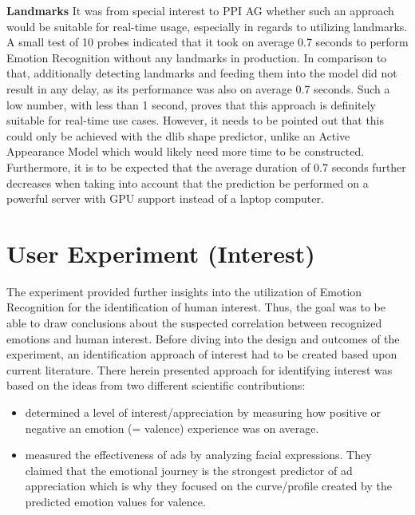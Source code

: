 \textbf{Landmarks}\newline
It was from special interest to PPI AG whether such an approach would be suitable for real-time usage, especially in regards to utilizing landmarks. 
\newline\newline
A small test of 10 probes indicated that it took on average 0.7 seconds to perform Emotion Recognition without any landmarks in production. In comparison to that, additionally detecting landmarks and feeding them into the model did not result in any delay, as its performance was also on average 0.7 seconds. Such a low number, with less than 1 second, proves that this approach is definitely suitable for real-time use cases. 
\newline\newline
However, it needs to be pointed out that this could only be achieved with the dlib shape predictor, unlike an Active Appearance Model which would likely need more time to be constructed. Furthermore, it is to be expected that the average duration of 0.7 seconds further decreases when taking into account that the prediction be performed on a powerful server with GPU support instead of a laptop computer.

\section{User Experiment (Interest)}
The experiment provided further insights into the utilization of Emotion Recognition for the identification of human interest. Thus, the goal was to be able to draw conclusions about the suspected correlation between recognized emotions and human interest. Before diving into the design and outcomes of the experiment, an identification approach of interest had to be created based upon current literature.
\newline\newline
There herein presented approach for identifying interest was based on the ideas from two different scientific contributions:
\begin{itemize}
    \item \citet{Kamaruddin:2016:MeasuringCustomerSatisfaction} determined a level of interest/appreciation by measuring how positive or negative an emotion (= valence) experience was on average.
    \item \citet{Poirier:2016:AdsFacialExpression} measured the effectiveness of ads by analyzing facial expressions. They claimed that the emotional journey is the strongest predictor of ad appreciation which is why they focused on the curve/profile created by the predicted emotion values for valence.
\end{itemize}

